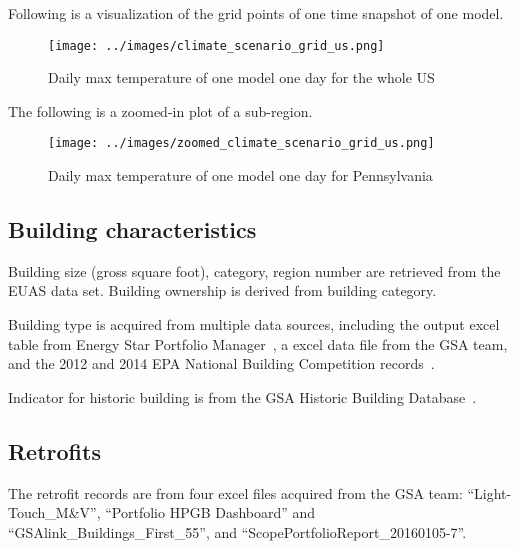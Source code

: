 \documentclass[12pt]{article}
\begin{document}

Following is a visualization of the grid points of one time snapshot of one
model.

\begin{figure}[H]
  \centering
  \texttt{[image: ../images/climate\_scenario\_grid\_us.png]}
  \caption[daily max temperature grid]{Daily max temperature of one model one
    day for the whole US}
  \label{fig:climate_scenario_grid_us}
\end{figure}

The following is a zoomed-in plot of a sub-region.
\begin{figure}[H]
  \centering
  \texttt{[image: ../images/zoomed\_climate\_scenario\_grid\_us.png]}
  \caption[daily max temperature grid]{Daily max temperature of one model one
    day for Pennsylvania}
  \label{fig:zoomed_climate_scenario_grid_us}
\end{figure}


\subsection{Building characteristics}
Building size (gross square foot), category, region number are retrieved from
the EUAS data set. Building ownership is derived from building category.

Building type is acquired from multiple data sources, including the
output excel table from Energy Star Portfolio Manager~\cite{portfolioManager2016}, 
a excel data file from the GSA team, and the 2012 and 2014 EPA National
Building Competition records~\cite{nationalCompetitionEPA2012, nationalCompetitionEPA2014}.

Indicator for historic building is from the GSA Historic Building Database~\cite{GSAhistoricBuilding2020}.

\subsection{Retrofits}
The retrofit records are from four excel files acquired from the GSA team:
``Light-Touch\_M\&V'', ``Portfolio HPGB Dashboard'' and
``GSAlink\_Buildings\_First\_55'', and ``ScopePortfolioReport\_20160105-7''.
\end{document}
